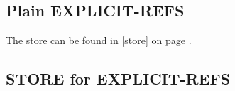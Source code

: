 \documentclass[../codeprint.tex]{subfiles}
\begin{document}
\subsection{Plain EXPLICIT-REFS}
\label{lang:EXPLICIT-REFS}
The store can be found in \autoref{store} on page \pageref{store}.



\subsection{STORE for EXPLICIT-REFS}

\end{document}
